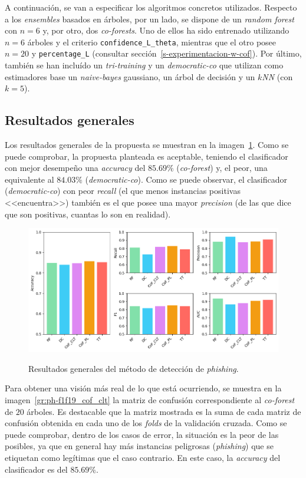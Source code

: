 A continuación, se van a especificar los algoritmos concretos utilizados. Respecto a los \textit{ensembles} basados en árboles, por un lado, se dispone de un \textit{random forest} con $n = 6$ y, por otro, dos \textit{co-forests}. Uno de ellos ha sido entrenado utilizando $n = 6$ árboles y el criterio \texttt{confidence\_L\_theta}, mientras que el otro posee $n = 20$ y \texttt{percentage\_L} (consultar sección~\ref{s-experimentacion-w-cof}). Por último, también se han incluído un \textit{tri-training} y un \textit{democratic-co} que utilizan como estimadores base un \textit{naive-bayes} gaussiano, un árbol de decisión y un \textit{$k$NN} (con $k = 5$).


\subsection{Resultados generales}

Los resultados generales de la propuesta se muestran en la imagen~\ref{gr:ph-f1f19-all}. Como se puede comprobar, la propuesta planteada es aceptable, teniendo el clasificador con mejor desempeño una \textit{accuracy} del $85$.$69\%$ (\textit{co-forest}) y, el peor, una equivalente al $84$.$03\%$ (\textit{democratic-co}). Como se puede observar, el clasificador (\textit{democratic-co}) con peor \textit{recall} (el que menos instancias positivas <<encuentra>>) también es el que posee una mayor \textit{precision} (de las que dice que son positivas, cuantas lo son en realidad).

\begin{figure}[h]
	\caption[\textit{Phishing}: detección (\texttt{f1-f19})]{Resultados generales del método de detección de \textit{phishing}.}
	\centering
	\includegraphics[width=\textwidth]{../img/memoria/5_phishing/f1f19_all_big}
	\label{gr:ph-f1f19-all}
\end{figure}

Para obtener una visión más real de lo que está ocurriendo, se muestra en la imagen~\ref{gr:ph-f1f19_cof_clt} la matriz de confusión correspondiente al \textit{co-forest} de $20$ árboles. Es destacable que la matriz mostrada es la suma de cada matriz de confusión obtenida en cada uno de los \textit{folds} de la validación cruzada. Como se puede comprobar, dentro de los casos de error, la situación es la peor de las posibles, ya que en general hay más instancias peligrosas (\textit{phishing}) que se etiquetan como legítimas que el caso contrario. En este caso, la \textit{accuracy} del clasificador es del $85$.$69\%$.

